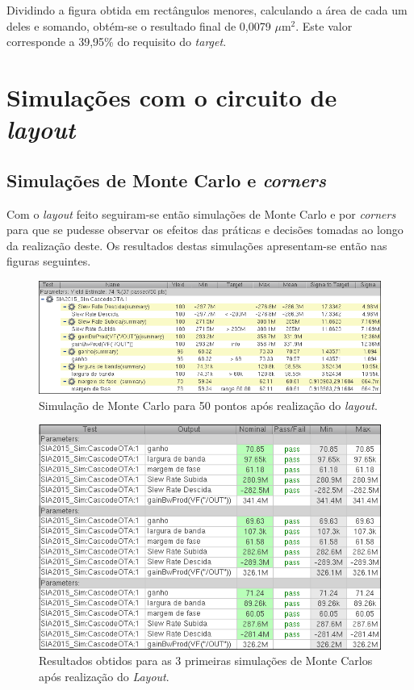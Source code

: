 \documentclass[11pt]{article}
\numberwithin{equation}{section}
\begin{document}
Dividindo  a figura obtida em rectângulos menores, calculando a área de cada um deles e somando, obtém-se o resultado final de 0,0079 $\mu\text{m}^2$. Este valor corresponde a 39,95\% do requisito do \textit{target}.

\section{Simulações com o circuito de \textit{layout}}

\subsection{Simulações de Monte Carlo e \textit{corners}}

Com o \textit{layout} feito seguiram-se então simulações de Monte Carlo e por \textit{corners} para que se pudesse observar os efeitos das práticas e decisões tomadas ao longo da realização deste. Os resultados destas simulações apresentam-se então nas figuras seguintes.

\begin{figure}[H]
	\centering
	\includegraphics[keepaspectratio=true, scale=0.50]{exps/MonteCarlo_50pt_Novo_MultiTransistor_Layout}
	\vspace{-0.5em}
	\caption{Simulação de Monte Carlo para 50 pontos após realização do \textit{layout}.}
	\vspace{-0.8em} 
\end{figure}

\begin{figure}[H]
	\centering
	\includegraphics[keepaspectratio=true, scale=0.50]{exps/MonteCarlo_3pt_Novo_MultiTransistor_Layout}
	\vspace{-0.5em}
	\caption{Resultados obtidos para as 3 primeiras simulações de Monte Carlos após realização do \textit{Layout}.}
	\vspace{-0.8em} 
\end{figure}
\end{document}
